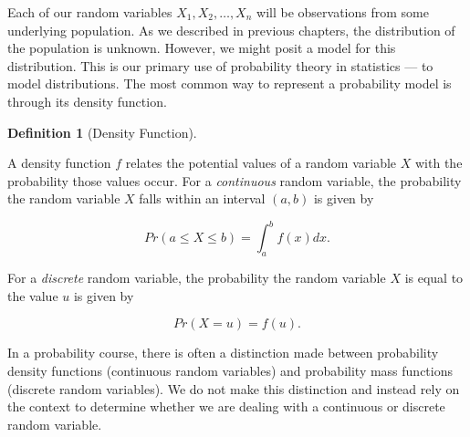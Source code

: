 \documentclass[
  letterpaper,
  DIV=11,
  numbers=noendperiod]{scrreprt}
\theoremstyle{definition}
\newtheorem{definition}{Definition}[chapter]
\theoremstyle{definition}
\theoremstyle{remark}
\begin{document}
Each of our random variables \(X_1, X_2, \dotsc, X_n\) will be
observations from some underlying population. As we described in
previous chapters, the distribution of the population is unknown.
However, we might posit a model for this distribution. This is our
primary use of probability theory in statistics --- to model
distributions. The most common way to represent a probability model is
through its density function.

\begin{definition}[Density
Function]\protect\hypertarget{def-density-function}{}\label{def-density-function}

A density function \(f\) relates the potential values of a random
variable \(X\) with the probability those values occur. For a
\emph{continuous} random variable, the probability the random variable
\(X\) falls within an interval \((a, b)\) is given by

\[Pr(a \leq X \leq b) = \int_{a}^{b} f(x) dx.\]

For a \emph{discrete} random variable, the probability the random
variable \(X\) is equal to the value \(u\) is given by

\[Pr(X = u) = f(u).\]

\end{definition}

\begin{tcolorbox}[enhanced jigsaw, left=2mm, toprule=.15mm, arc=.35mm, breakable, opacitybacktitle=0.6, opacityback=0, rightrule=.15mm, colbacktitle=quarto-callout-note-color!10!white, coltitle=black, leftrule=.75mm, toptitle=1mm, colframe=quarto-callout-note-color-frame, titlerule=0mm, title=\textcolor{quarto-callout-note-color}{\faInfo}\hspace{0.5em}{Note}, bottomrule=.15mm, colback=white, bottomtitle=1mm]

In a probability course, there is often a distinction made between
probability density functions (continuous random variables) and
probability mass functions (discrete random variables). We do not make
this distinction and instead rely on the context to determine whether we
are dealing with a continuous or discrete random variable.

\end{tcolorbox}
\end{document}

